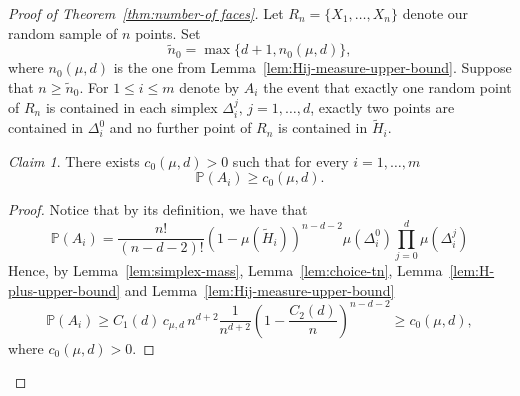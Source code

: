 \documentclass[10pt]{amsart}
\newcommand{\1}{\textbf{1}}
\numberwithin{equation}{section} %
\theoremstyle{remark}
\newtheorem{claim}{Claim}
\theoremstyle{definition}
\begin{document}
\begin{proof}[Proof of Theorem~\ref{thm:number-of faces}]
Let $R_n=\{X_1,\ldots,X_n\}$ denote our random sample of $n$ points. Set \[\widetilde{n}_0= \max\{d+1,n_0(\mu,d)\},\] where $n_0(\mu,d)$ is the one from Lemma~\ref{lem:Hij-measure-upper-bound}. Suppose that $n \geq \widetilde{n}_0$. For $1 \leq i \leq m$ denote by $A_i$ the event that exactly one random point of $R_n$ is contained in each simplex $\Delta_i^j, \, j=1,\ldots,d$, exactly two points are contained in $\Delta_i^0$ and no further point of $R_n$ is contained in $\widetilde{H}_i$.

\begin{claim}\label{claim:A-face-events-lower-bound}
    There exists $c_0(\mu,d)>0$ such that for every $i=1,\ldots,m$ \[\mathbb{P}(A_i) \geq c_0(\mu,d).\]
\end{claim}

\begin{proof}
Notice that by its definition, we have that
\[
\mathbb P(A_i)
=
\frac{n!}{(n-d-2)!}
\left(1-\mu(\widetilde{H}_i)\right)^{n-d-2}\mu(\Delta_i^0)\prod_{j=0}^d \mu(\Delta_i^j)
 \] Hence,  by Lemma~\ref{lem:simplex-mass}, Lemma~\ref{lem:choice-tn}, Lemma~\ref{lem:H-plus-upper-bound} and Lemma~\ref{lem:Hij-measure-upper-bound}
\[
\mathbb{P}(A_i) \geq C_1(d)\,c_{\mu,d}  \,n^{d+2}\frac1{n^{d+2}}
\left(1-\frac {C_2(d)}{n}\right)^{n-d-2}
\ge c_0(\mu,d),
\]
where $c_0(\mu,d)>0$.
\end{proof}


\end{proof}
\end{document}
